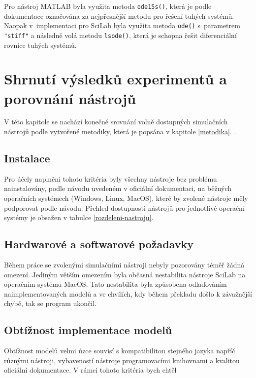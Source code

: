 Pro nástroj MATLAB byla využita metoda \texttt{ode15s()}, která je podle dokumentace \cite{MATLAB:2010} označována za nejpřesnější metodu pro řešení tuhých systémů. Naopak v~implementaci pro SciLab byla využita metoda \texttt{ode()} s~parametrem \texttt{"stiff"} a následně volá metodu \texttt{lsode()}, která je schopna řešit diferenciální rovnice tuhých systémů. 

\section{Shrnutí výsledků experimentů a porovnání nástrojů}

V této kapitole se nachází konečné srovnání volně dostupných simulačních nástrojů podle vytvořené metodiky, která je popsána v kapitole \ref{metodika}. .




\subsection*{Instalace}
Pro účely naplnění tohoto kritéria byly všechny nástroje bez problému nainstalovány, podle návodu uvedeném v oficiální dokumentaci, na běžných operačních systémech (Windows, Linux, MacOS), které by zvolené nástroje měly podporovat podle návodu. Přehled dostupnosti nástrojů pro jednotlivé operační systémy je obsažen v tabulce \ref{rozdeleni-nastroju}. 
\subsection*{Hardwarové a softwarové požadavky}
Během práce se zvolenými simulačními nástroji nebyly pozorovány téměř žádná omezení. Jediným větším omezením byla občasná nestabilita nástroje SciLab na operačním systému MacOS. Tato nestabilita byla způsobena odlaďováním naimplementovaných modelů a ve chvílích, kdy během překladu došlo k závažnější chybě, tak se program ukončil.
\subsection*{Obtížnost implementace modelů}
Obtížnost modelů velmi úzce souvisí s kompatibilitou stejného jazyka napříč různými nástroji, vybaveností nástroje programovacími knihovnami a kvalitou oficiální dokumentace. V rámci tohoto kritéria bych chtěl 

